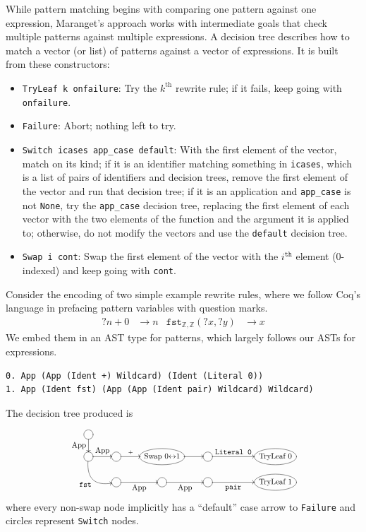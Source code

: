 While pattern matching begins with comparing one pattern against one expression, Maranget's approach works with intermediate goals that check multiple patterns against multiple expressions.
A decision tree describes how to match a vector (or list) of patterns against a vector of expressions.
It is built from these constructors:
\begin{itemize}
  \item \texttt{TryLeaf k onfailure}: Try the $k^\text{th}$ rewrite rule; if it fails, keep going with \texttt{onfailure}.
  \item \texttt{Failure}: Abort; nothing left to try.
  \item \texttt{Switch icases app\_case default}:
    With the first element of the vector, match on its kind; if it is an identifier matching something in \texttt{icases}, which is a list of pairs of identifiers and decision trees, remove the first element of the vector and run that decision tree; if it is an application and \texttt{app\_case} is not \texttt{None}, try the \texttt{app\_case} decision tree, replacing the first element of each vector with the two elements of the function and the argument it is applied to; otherwise, do not modify the vectors and use the \texttt{default} decision tree.
  \item \texttt{Swap i cont}: Swap the first element of the vector with the $i^\texttt{th}$ element (0-indexed) and keep going with \texttt{cont}.
\end{itemize}

Consider the encoding of two simple example rewrite rules, where we follow Coq's \Ltac{} language in prefacing pattern variables with question marks.
\begin{align*}
  ?n + 0 & \to n %
  &
  \texttt{fst}_{\mathbb{Z},\mathbb{Z}}(?x, ?y) & \to x
\end{align*}
We embed them in an AST type for patterns, which largely follows our ASTs for expressions.
\begin{verbatim}
0. App (App (Ident +) Wildcard) (Ident (Literal 0))
1. App (Ident fst) (App (App (Ident pair) Wildcard) Wildcard)
\end{verbatim}
The decision tree produced is \label{sec:compiled-pattern}
\[\resizebox{230px}{!}{\xymatrix@R-1pc{
  *++[o][F-]\txt{} \ar[d]_{\txt{App}} \\
  *++[o][F-]\txt{} \ar[r]^-{\txt{App}} \ar@/_1.5pc/[dr]_{\txt{\texttt{fst}}} & *++[o][F-]\txt{} \ar[r]^-{+} & *++[o][F-]\txt{Swap 0$\leftrightarrow$1} \ar[r] & *++[o][F-]\txt{} \ar[rr]^-{\txt{\texttt{Literal~0}}} && *++[o][F-]\txt{TryLeaf 0} \\
  & *++[o][F-]\txt{} \ar[r]_-{\txt{App}} & *++[o][F-]\txt{} \ar[r]_-{\txt{App}} & *++[o][F-]\txt{} \ar[rr]_-{\txt{\texttt{pair}}} && *++[o][F-]\txt{TryLeaf 1}
}}\]
\noindent where every non-swap node implicitly has a ``default'' case arrow to \texttt{Failure} and circles represent \texttt{Switch} nodes.

